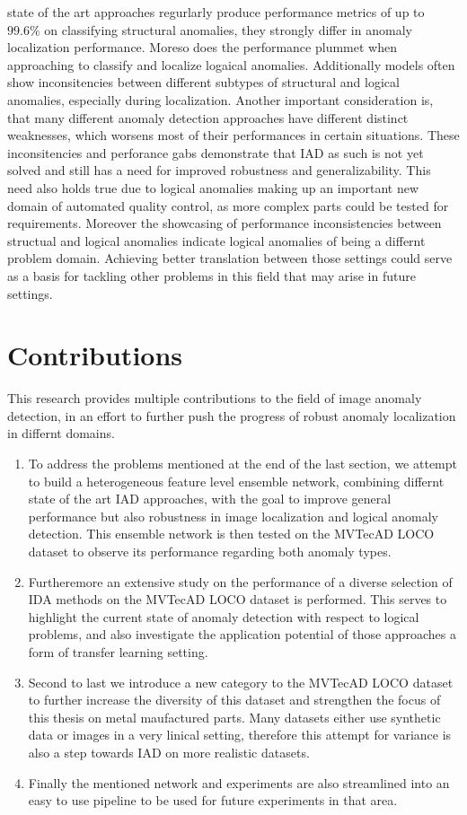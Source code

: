 state of the art approaches regurlarly produce performance metrics of up to $99.6 \% $ on classifying structural anomalies, they 
strongly differ in anomaly localization performance. Moreso does the performance plummet when approaching to classify and localize logaical 
anomalies. Additionally models often show inconsitencies between different subtypes of structural and logical anomalies, especially during 
localization. Another important consideration is, that many different anomaly detection approaches have different distinct weaknesses, which worsens most 
of their performances in certain situations. These inconsitencies and perforance gabs demonstrate that IAD as such is not yet solved and still has a need for improved 
robustness and generalizability. This need also holds true due to logical anomalies making up an important new domain of automated 
quality control, as more complex parts could be tested for requirements. Moreover the showcasing of performance inconsistencies between 
structual and logical anomalies indicate logical anomalies of being a differnt problem domain. Achieving better translation between those 
settings could serve as a basis for tackling other problems in this field that may arise in future settings.


\section{Contributions}
\label{sec:contributions}
This research provides multiple contributions to the field of image anomaly detection, in an effort to further push the progress of 
robust anomaly localization in differnt domains. 

\begin{enumerate}
  \item To address the problems mentioned at the end of the last section, we attempt 
  to build a heterogeneous feature level ensemble network, combining differnt state of the art IAD approaches, with the goal to improve 
  general performance but also robustness in image localization and logical anomaly detection. This ensemble network is then tested on 
  the MVTecAD LOCO dataset to observe its performance regarding both anomaly types.
  \item Furtheremore an extensive study on the performance of a diverse selection of IDA methods on the MVTecAD LOCO dataset is performed. 
  This serves to highlight the current state of anomaly detection with respect to logical problems, and also investigate the application potential of 
  those approaches a form of transfer learning setting.
  \item Second to last we introduce a new category to the MVTecAD LOCO dataset to further increase the diversity of this dataset and strengthen the focus 
  of this thesis on metal maufactured parts. Many datasets either use synthetic data or images in a very linical setting, therefore this 
  attempt for variance is also a step towards IAD on more realistic datasets.
  \item Finally the mentioned network and experiments are also streamlined into an easy to use pipeline 
  to be used for future experiments in that area.
\end{enumerate}

